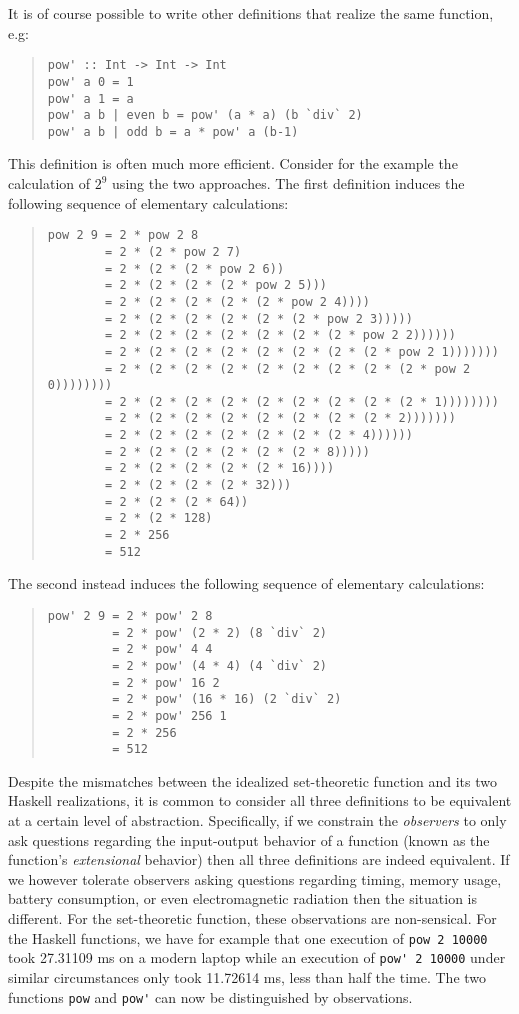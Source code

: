 It is of course possible to write other definitions that realize the same function, e.g:
\begin{quote}
\begin{verbatim} 
pow' :: Int -> Int -> Int
pow' a 0 = 1
pow' a 1 = a
pow' a b | even b = pow' (a * a) (b `div` 2)
pow' a b | odd b = a * pow' a (b-1)
\end{verbatim}
\end{quote}
This definition is often much more efficient. Consider for the example the calculation of $2^{9}$ using the two approaches. The first definition induces the following sequence of elementary calculations:
\begin{quote}
\begin{verbatim} 
pow 2 9 = 2 * pow 2 8
        = 2 * (2 * pow 2 7)  
        = 2 * (2 * (2 * pow 2 6))  
        = 2 * (2 * (2 * (2 * pow 2 5)))  
        = 2 * (2 * (2 * (2 * (2 * pow 2 4)))) 
        = 2 * (2 * (2 * (2 * (2 * (2 * pow 2 3))))) 
        = 2 * (2 * (2 * (2 * (2 * (2 * (2 * pow 2 2)))))) 
        = 2 * (2 * (2 * (2 * (2 * (2 * (2 * (2 * pow 2 1))))))) 
        = 2 * (2 * (2 * (2 * (2 * (2 * (2 * (2 * (2 * pow 2 0)))))))) 
        = 2 * (2 * (2 * (2 * (2 * (2 * (2 * (2 * (2 * 1)))))))) 
        = 2 * (2 * (2 * (2 * (2 * (2 * (2 * (2 * 2)))))))
        = 2 * (2 * (2 * (2 * (2 * (2 * (2 * 4))))))
        = 2 * (2 * (2 * (2 * (2 * (2 * 8)))))
        = 2 * (2 * (2 * (2 * (2 * 16))))
        = 2 * (2 * (2 * (2 * 32))) 
        = 2 * (2 * (2 * 64))
        = 2 * (2 * 128)
        = 2 * 256
        = 512
\end{verbatim}
\end{quote}
The second instead induces the following sequence of elementary calculations:
\begin{quote}
\begin{verbatim} 
pow' 2 9 = 2 * pow' 2 8
         = 2 * pow' (2 * 2) (8 `div` 2) 
         = 2 * pow' 4 4
         = 2 * pow' (4 * 4) (4 `div` 2) 
         = 2 * pow' 16 2 
         = 2 * pow' (16 * 16) (2 `div` 2) 
         = 2 * pow' 256 1
         = 2 * 256
         = 512
\end{verbatim}
\end{quote} 

Despite the mismatches between the idealized set-theoretic function
and its two Haskell realizations, it is common to consider all three
definitions to be equivalent at a certain level of
abstraction. Specifically, if we constrain the \emph{observers} to
only ask questions regarding the input-output behavior of a function
(known as the function's \emph{extensional} behavior) then all three
definitions are indeed equivalent. If we however tolerate observers
asking questions regarding timing, memory usage, battery consumption,
or even electromagnetic radiation then the situation is different. For
the set-theoretic function, these observations are non-sensical. For
the Haskell functions, we have for example that one execution of
\verb|pow 2 10000| took 27.31109 ms on a modern laptop while an
execution of \verb|pow' 2 10000| under similar circumstances only took
11.72614 ms, less than half the time. The two functions \verb|pow| and
\verb|pow'| can now be distinguished by observations.

